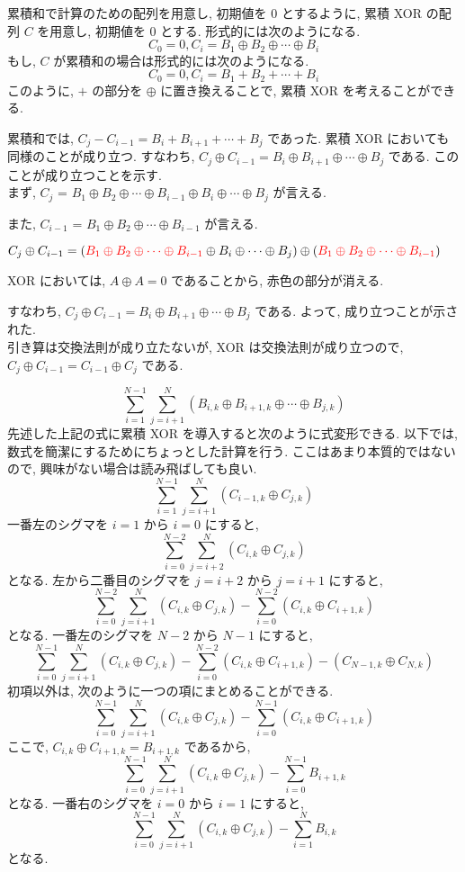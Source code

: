     累積和で計算のための配列を用意し, 初期値を $0$ とするように, 累積 XOR の配列 $C$ を用意し, 初期値を $0$ とする.
    形式的には次のようになる.
    $$C_0 = 0, C_i = B_1 \oplus B_2 \oplus \cdots \oplus B_i$$
    もし, $C$ が累積和の場合は形式的には次のようになる.
    $$C_0 = 0, C_i = B_1 + B_2 + \cdots + B_i$$
    このように, $+$ の部分を $\oplus$ に置き換えることで, 累積 XOR を考えることができる.

    累積和では, $C_j - C_{i - 1} = B_i + B_{i + 1} + \cdots + B_j$ であった.
    累積 XOR においても同様のことが成り立つ.
    すなわち, $C_j \oplus C_{i - 1} = B_i \oplus B_{i + 1} \oplus \cdots \oplus B_j$ である.
    このことが成り立つことを示す.\\

    まず, $C_j$ = $B_1 \oplus B_2 \oplus \cdots \oplus B_{i - 1} \oplus B_i \oplus \cdots \oplus B_j$ が言える.

    また, $C_{i - 1}$ = $B_1 \oplus B_2 \oplus \cdots \oplus B_{i - 1}$ が言える.

    $C_j \oplus C_{i - 1} = ({\color{red}{B_1 \oplus B_2 \oplus \cdots \oplus B_{i - 1}}} \oplus B_i \oplus \cdots \oplus B_j) \oplus ({\color{red}{B_1 \oplus B_2 \oplus \cdots \oplus B_{i - 1}}})$

    XOR においては, $A \oplus A = 0$ であることから, 赤色の部分が消える.

    すなわち, $C_j \oplus C_{i - 1} = B_i \oplus B_{i + 1} \oplus \cdots \oplus B_j$ である.
    よって, 成り立つことが示された.\\

    引き算は交換法則が成り立たないが, XOR は交換法則が成り立つので, $C_j \oplus C_{i - 1} = C_{i - 1} \oplus C_j$ である.

    $$\sum_{i = 1}^{N - 1}\sum_{j = i + 1}^N (B_{i, k} \oplus B_{i + 1, k} \oplus \cdots \oplus B_{j, k})$$
    先述した上記の式に累積 XOR を導入すると次のように式変形できる.
    以下では, 数式を簡潔にするためにちょっとした計算を行う.
    ここはあまり本質的ではないので, 興味がない場合は読み飛ばしても良い.
    $$\sum_{i = 1}^{N - 1}\sum_{j = i + 1}^N (C_{i - 1, k} \oplus C_{j, k})$$
    一番左のシグマを $i = 1$ から $i = 0$ にすると,
    $$\sum_{i = 0}^{N - 2}\sum_{j = i + 2}^N (C_{i, k} \oplus C_{j, k})$$
    となる.
    左から二番目のシグマを $j = i + 2$ から $j = i + 1$ にすると,
    $$\sum_{i = 0}^{N - 2}\sum_{j = i + 1}^N (C_{i, k} \oplus C_{j, k}) - \sum_{i = 0}^{N - 2} (C_{i, k} \oplus C_{i + 1, k})$$
    となる.
    一番左のシグマを $N - 2$ から $N - 1$ にすると,
    $$\sum_{i = 0}^{N - 1}\sum_{j = i + 1}^N (C_{i, k} \oplus C_{j, k}) - \sum_{i = 0}^{N - 2} (C_{i, k} \oplus C_{i + 1, k}) - (C_{N - 1, k} \oplus C_{N, k})$$
    初項以外は, 次のように一つの項にまとめることができる.
    $$\sum_{i = 0}^{N - 1}\sum_{j = i + 1}^N (C_{i, k} \oplus C_{j, k}) - \sum_{i = 0}^{N - 1} (C_{i, k} \oplus C_{i + 1, k})$$
    ここで, $C_{i, k} \oplus C_{i + 1, k} = B_{i + 1, k}$ であるから,
    $$\sum_{i = 0}^{N - 1}\sum_{j = i + 1}^N (C_{i, k} \oplus C_{j, k}) - \sum_{i = 0}^{N - 1} B_{i + 1, k}$$
    となる.
    一番右のシグマを $i = 0$ から $i = 1$ にすると,
    $$\sum_{i = 0}^{N - 1}\sum_{j = i + 1}^N (C_{i, k} \oplus C_{j, k}) - \sum_{i = 1}^{N} B_{i, k}$$
    となる.

